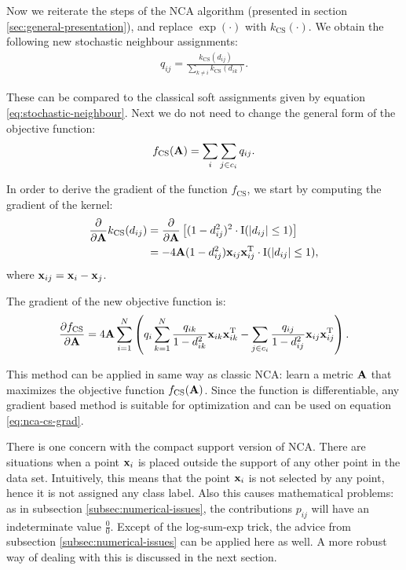 	Now we reiterate the steps of the NCA algorithm (presented in section \ref{sec:general-presentation}), and replace $\exp(\cdot)$ with $k_\text{CS}(\cdot)$. We obtain the following new stochastic neighbour assignments:
	\begin{align}
		q_{ij} = \frac{k_{\text{CS}}(d_{ij})}{\sum_{k\neq i} k_{\text{CS}}(d_{ik})}.
		\label{eq:stochastic-neighbours-cs}
	\end{align}
	
	These can be compared to the classical soft assignments given by equation \eqref{eq:stochastic-neighbour}. Next we do not need to change the general form of the objective function: 
	\begin{align}
		f_\text{CS}(\mathbf{A}) = \sum_{i}\sum_{j\in c_i} q_{ij}.
	\end{align}
	
	In order to derive the gradient of the function $f_\text{CS}$, we start by computing the gradient of the kernel:
	\begin{align}
		\frac{\partial}{\partial\mathbf{A}}k_\text{CS}(d_{ij}) 
		&= 
	\frac{\partial}{\partial\mathbf{A}}\left[(1-d_{ij}^2)^2\cdot\mathrm{I}(\left|d_{ij}\right|\le
	1)\right]\notag\\
		&= -4\mathbf{A}(1-d_{ij}^2)  \mathbf{x}_{ij} \mathbf{x}_{ij}^\mathrm{T} \cdot
	\mathrm{I}(\left|d_{ij}\right|\le 1),\label{eq:nca-cs-grad-kernel}
	\end{align}
	where $\mathbf{x}_{ij}=\mathbf{x}_i-\mathbf{x}_j$.
	
	The gradient of the new objective function is:
	\begin{align}
		\frac{\partial f_\text{CS}}{\partial \mathbf{A}}=4\mathbf{A}\sum_{i=1}^{N}
		\left(
		q_i \sum_{k=1}^N \frac{q_{ik}}{1-d_{ik}^2} \mathbf{x}_{ik}\mathbf{x}_{ik}^{\textrm{T}}
		- \sum_{j\in c_i} \frac{q_{ij}}{1-d_{ij}^2}\mathbf{x}_{ij}\mathbf{x}_{ij}^{\textrm{T}} 
		\right).
		\label{eq:nca-cs-grad}
	\end{align}
	
	This method can be applied in same way as classic NCA: learn a metric $\mathbf{A}$ that maximizes the objective function $f_\text{CS}(\mathbf{A})$. Since the function is differentiable, any gradient based method is suitable for optimization and can be used on equation \eqref{eq:nca-cs-grad}.
	
	There is one concern with the compact support version of NCA. There are situations when a point $\mathbf{x}_i$ is placed outside the support of any other point in the data set. Intuitively, this means that the point $\mathbf{x}_i$ is not selected by any point, hence it is not assigned any class label. Also this causes mathematical problems: as in subsection \ref{subsec:numerical-issues}, the contributions $p_{ij}$ will have an indeterminate value $\frac{0}{0}$. Except of the log-sum-exp trick, the advice from subsection \ref{subsec:numerical-issues} can be applied here as well. A more robust way of dealing with this is discussed in the next section.
	
